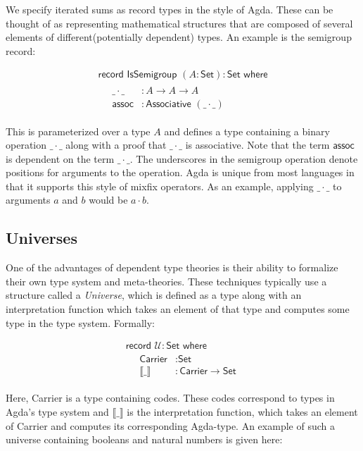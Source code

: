 \documentclass[acmsmall,review,authorversion]{acmart}
\newcommand{\term}[1]{\textsf{#1}}
\newcommand{\type}[1]{\textsf{#1}}
\newcommand{\Carrier}{\term{Carrier}}
\newcommand{\Universe}{\mathcal{U}}
\newcommand{\Set}{\type{Set}}
\newcommand{\Interp}[1]{\llbracket #1 \rrbracket}
\newcommand{\?}{\stackrel{?}{\approx}}
\newcommand{\record}[2]{\textsf{record } #1 : #2 \textsf{ where}}
\newcommand{\ra}{\rightarrow}
\begin{document}
We specify iterated sums as record types in the style of Agda. These can be
thought of as representing mathematical structures that are composed of several
elements of different(potentially dependent) types. An example is the semigroup
record: 

$$
\begin{array}{l}
 \record{\textsf{IsSemigroup } (A : \Set)}{\Set}\\
  \quad
  \begin{array}{rl}
    \_\cdot\_ &: A \ra A \ra A\\
    \textsf{assoc} &: \textsf{Associative } (\_\cdot\_)
  \end{array}
\end{array}
$$

This is parameterized over a type $A$ and defines a type containing a binary
operation $\_\cdot\_$ along with a proof that $\_\cdot\_$ is associative. Note
that the term $\textsf{assoc}$ is dependent on the term $\_\cdot\_$. The
underscores in the semigroup operation denote positions for arguments to the
operation. Agda is unique from most languages in that it supports this style of
mixfix operators. As an example, applying $\_\cdot\_$ to arguments $a$ and $b$
would be $a \cdot b$.

\subsection{Universes} One of the advantages of dependent type theories is their
ability to formalize their own type system and meta-theories. These techniques
typically use a structure called a \textit{Universe}, which is defined as a type
along with an interpretation function which takes an element of that type and
computes some type in the type system. Formally:
 
$$
\begin{array}{l}
\record{\Universe}{\Set}\\
\quad  \begin{array}{rl}
         \Carrier &: \Set \\
         \Interp{\_} &: \Carrier \rightarrow \Set
       \end{array}
\end{array}
$$

Here, \textsf{Carrier} is a type containing codes. These codes correspond to
types in Agda's type system and $\Interp{\_}$ is the interpretation function,
which takes an element of \textsf{Carrier} and computes its corresponding
Agda-type. An example of such a universe containing booleans and natural numbers
is given here:
\end{document}
